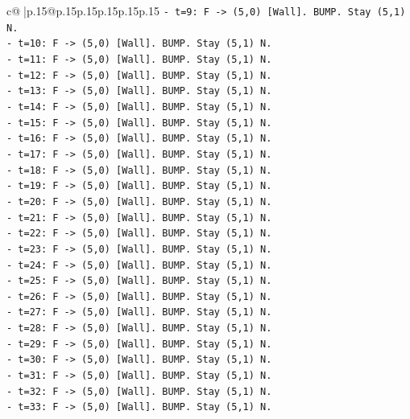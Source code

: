 \documentclass{article}
\begin{document}
{\begin{supertabular}{c@{$\;$}|p{.15\linewidth}@{}p{.15\linewidth}p{.15\linewidth}p{.15\linewidth}p{.15\linewidth}p{.15\linewidth}}
{{{\texttt{{-} t=9: F {-}> (5,0) {[}Wall{]}. BUMP. Stay (5,1) N.} \\
\texttt{{-} t=10: F {-}> (5,0) {[}Wall{]}. BUMP. Stay (5,1) N.} \\
\texttt{{-} t=11: F {-}> (5,0) {[}Wall{]}. BUMP. Stay (5,1) N.} \\
\texttt{{-} t=12: F {-}> (5,0) {[}Wall{]}. BUMP. Stay (5,1) N.} \\
\texttt{{-} t=13: F {-}> (5,0) {[}Wall{]}. BUMP. Stay (5,1) N.} \\
\texttt{{-} t=14: F {-}> (5,0) {[}Wall{]}. BUMP. Stay (5,1) N.} \\
\texttt{{-} t=15: F {-}> (5,0) {[}Wall{]}. BUMP. Stay (5,1) N.} \\
\texttt{{-} t=16: F {-}> (5,0) {[}Wall{]}. BUMP. Stay (5,1) N.} \\
\texttt{{-} t=17: F {-}> (5,0) {[}Wall{]}. BUMP. Stay (5,1) N.} \\
\texttt{{-} t=18: F {-}> (5,0) {[}Wall{]}. BUMP. Stay (5,1) N.} \\
\texttt{{-} t=19: F {-}> (5,0) {[}Wall{]}. BUMP. Stay (5,1) N.} \\
\texttt{{-} t=20: F {-}> (5,0) {[}Wall{]}. BUMP. Stay (5,1) N.} \\
\texttt{{-} t=21: F {-}> (5,0) {[}Wall{]}. BUMP. Stay (5,1) N.} \\
\texttt{{-} t=22: F {-}> (5,0) {[}Wall{]}. BUMP. Stay (5,1) N.} \\
\texttt{{-} t=23: F {-}> (5,0) {[}Wall{]}. BUMP. Stay (5,1) N.} \\
\texttt{{-} t=24: F {-}> (5,0) {[}Wall{]}. BUMP. Stay (5,1) N.} \\
\texttt{{-} t=25: F {-}> (5,0) {[}Wall{]}. BUMP. Stay (5,1) N.} \\
\texttt{{-} t=26: F {-}> (5,0) {[}Wall{]}. BUMP. Stay (5,1) N.} \\
\texttt{{-} t=27: F {-}> (5,0) {[}Wall{]}. BUMP. Stay (5,1) N.} \\
\texttt{{-} t=28: F {-}> (5,0) {[}Wall{]}. BUMP. Stay (5,1) N.} \\
\texttt{{-} t=29: F {-}> (5,0) {[}Wall{]}. BUMP. Stay (5,1) N.} \\
\texttt{{-} t=30: F {-}> (5,0) {[}Wall{]}. BUMP. Stay (5,1) N.} \\
\texttt{{-} t=31: F {-}> (5,0) {[}Wall{]}. BUMP. Stay (5,1) N.} \\
\texttt{{-} t=32: F {-}> (5,0) {[}Wall{]}. BUMP. Stay (5,1) N.} \\
\texttt{{-} t=33: F {-}> (5,0) {[}Wall{]}. BUMP. Stay (5,1) N.} \\
}}}
\end{supertabular}}
\end{document}
